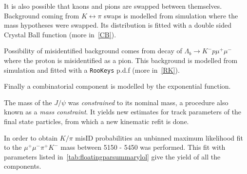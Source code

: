 It is also possible that kaons and pions are swapped between themselves. Background coming from $K \leftrightarrow \pi$ swaps is modelled from simulation where the mass hypotheses were swapped. Its distribution is fitted with a double sided Crystal Ball function \cite{Skwarnicki:1986xj} (more in~\autoref{CB}).

Possibility of misidentified background comes from decay of $\Lambda_{b} \rightarrow K^{-} p \mu^{+} \mu^{-}$ where the proton is misidentified as a pion. This background is modelled from simulation and fitted with a \texttt{RooKeys} p.d.f (more in~\autoref{RK}).

Finally a combinatorial component is modelled by the exponential function.


The mass of the $J/\psi$ was \textit{constrained} to its nominal mass, a procedure also known as a \textit{mass constraint}. It yields new estimates for track parameters of the final state particles, from which a new kinematic refit is done.

In order to obtain $K/\pi$ misID probabilities an unbinned maximum likelihood fit to the $\mu^{+} \mu^{-} \pi^{+} K^{-}$ mass between 5150 - 5450 \mevcc was performed. This fit with parameters listed in~\autoref{tab:floatingparsummarylol} give the yield of all the components. 

